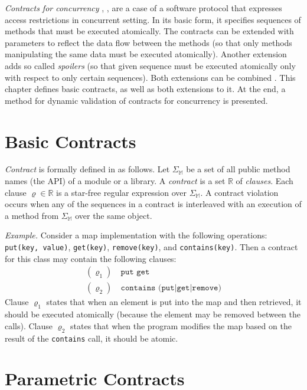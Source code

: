 \emph{Contracts for concurrency} \cite{FITPUB10817},
\cite{DBLP:journals/corr/SousaDFL15}, are a case of a software protocol that
expresses access restrictions in concurrent setting. In its basic form, it
specifies sequences of methods that must be executed atomically. The contracts
can be extended with parameters to reflect the data flow between the methods (so
that only methods manipulating the same data must be executed atomically).
Another extension adds so called \emph{spoilers} (so that given sequence must be
executed atomically only with respect to only certain sequences). Both
extensions can be combined \cite{contracts}. This chapter defines basic
contracts, as well as both extensions to it. At the end, a method for dynamic
validation of contracts for concurrency is presented.

\section{Basic Contracts}
\label{basicContracts}

\emph{Contract} is formally defined in \cite{FITPUB10817} as follows. Let
$\Sigma_\mathbb{M}$ be a set of all public method names (the API) of a module or
a library. A \emph{contract} is a set $\mathbb{R}$ of \emph{clauses}. Each
clause $\varrho \in \mathbb{R}$ is a star-free regular expression over
$\Sigma_\mathbb{M}$. A contract violation occurs when any of the sequences in a
contract is interleaved with an execution of a method from $\Sigma_\mathbb{M}$
over the same object.

\emph{Example.} Consider a map implementation with the following operations:
\texttt{put(key, value)}, \texttt{get(key)}, \texttt{remove(key)}, and
\texttt{contains(key)}. Then a contract for this class may contain the following
clauses:
\begin{align*}
    (\varrho_1) &\ \texttt{put get}\\
    (\varrho_2) &\ \texttt{contains (put|get|remove)}
\end{align*}
Clause $\varrho_1$ states that when an element is put into the map and then
retrieved, it should be executed atomically (because the element may be removed
between the calls). Clause $\varrho_2$ states that when the program modifies the
map based on the result of the \texttt{contains} call, it should be atomic.

\section{Parametric Contracts}
\label{parametricContracts}

